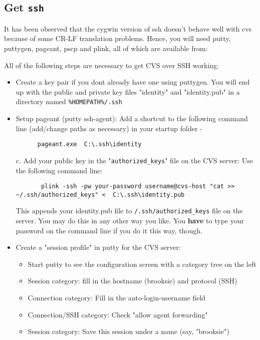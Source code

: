 \documentclass{book}
\def\t#1{{\tt #1}}
\begin{document}
 \subsection{Get \t{ssh}}

It has been observed that the cygwin version of ssh doesn't behave well
with cvs because of some CR-LF translation problems. Hence, you will need 
putty, puttygen, pageant, pscp and plink, all of which are available from:


All of the following steps are necessary to get CVS over SSH working:
\begin{itemize}
\item Create a key pair if you dont already have one using puttygen. You will
end up with the public and private key files "identity" and "identity.pub" in
a directory named \t{\%HOMEPATH\%/.ssh}

\item Setup pageant (putty ssh-agent): Add a shortcut to the following command
line (add/change paths as necessary) in your startup folder -

\begin{verbatim}
      pageant.exe  C:\.ssh\identity 
\end{verbatim}

c. Add your public key in the "\t{authorized\_keys}" file on the CVS server:
   Use the following command line:

\begin{verbatim}
       plink -ssh -pw your-password username@cvs-host "cat >> ~/.ssh/authorized_keys" <  C:\.ssh\identity.pub
\end{verbatim}
  
   This appends your identity.pub file to \t{\home{}/.ssh/authorized\_keys} file
   on the server. You may do this in any other way you like. You {\bf have} to
   type your password on the command line if you do it this way, though.

\item Create a "session profile" in putty for the CVS server:
  \begin{itemize}
  \item Start putty to see the configuration screen with a category tree on
   the left 
  \item Session category: fill in the hostname (brooksie) and protocol (SSH) 
  \item Connection category: Fill in the auto-login-username field
  \item Connection/SSH category: Check "allow agent forwarding"
  \item Session category: Save this session under a name (say, "brooksie")
  \end{itemize}



\end{itemize}
\end{document}
